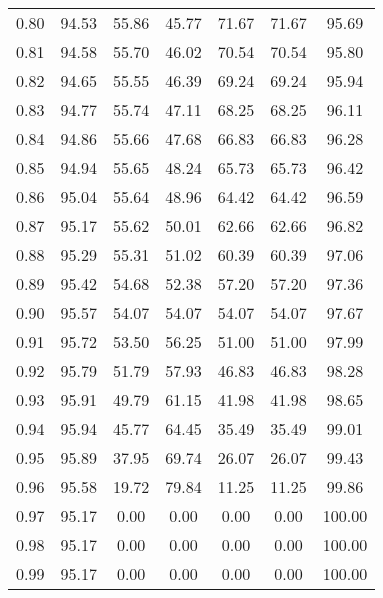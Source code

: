 \begin{tabular}{|c|c|c|c|c|c|c|}
      0.80 &     94.53 &     55.86 &      45.77 &   71.67 &      71.67 &         95.69 \\
      0.81 &     94.58 &     55.70 &      46.02 &   70.54 &      70.54 &         95.80 \\
      0.82 &     94.65 &     55.55 &      46.39 &   69.24 &      69.24 &         95.94 \\
      0.83 &     94.77 &     55.74 &      47.11 &   68.25 &      68.25 &         96.11 \\
      0.84 &     94.86 &     55.66 &      47.68 &   66.83 &      66.83 &         96.28 \\
      0.85 &     94.94 &     55.65 &      48.24 &   65.73 &      65.73 &         96.42 \\
      0.86 &     95.04 &     55.64 &      48.96 &   64.42 &      64.42 &         96.59 \\
      0.87 &     95.17 &     55.62 &      50.01 &   62.66 &      62.66 &         96.82 \\
      0.88 &     95.29 &     55.31 &      51.02 &   60.39 &      60.39 &         97.06 \\
      0.89 &     95.42 &     54.68 &      52.38 &   57.20 &      57.20 &         97.36 \\
      0.90 &     95.57 &     54.07 &      54.07 &   54.07 &      54.07 &         97.67 \\
      0.91 &     95.72 &     53.50 &      56.25 &   51.00 &      51.00 &         97.99 \\
      0.92 &     95.79 &     51.79 &      57.93 &   46.83 &      46.83 &         98.28 \\
      0.93 &     95.91 &     49.79 &      61.15 &   41.98 &      41.98 &         98.65 \\
      0.94 &     95.94 &     45.77 &      64.45 &   35.49 &      35.49 &         99.01 \\
      0.95 &     95.89 &     37.95 &      69.74 &   26.07 &      26.07 &         99.43 \\
      0.96 &     95.58 &     19.72 &      79.84 &   11.25 &      11.25 &         99.86 \\
      0.97 &     95.17 &      0.00 &       0.00 &    0.00 &       0.00 &        100.00 \\
      0.98 &     95.17 &      0.00 &       0.00 &    0.00 &       0.00 &        100.00 \\
      0.99 &     95.17 &      0.00 &       0.00 &    0.00 &       0.00 &        100.00 \\
\bottomrule
\end{tabular}
